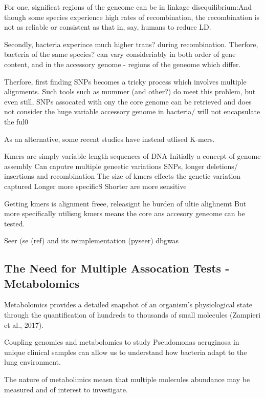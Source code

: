 \documentclass[]{article}
\begin{document}
For one, significat regions of the geneome can be in linkage
disequilibrium:And though some species experience high rates of
recombination, the recombination is not as reliable or consistent as
that in, say, humans to reduce LD.

Secondly, bacteria experince much higher trans? during recombination.
Therfore, bacteria of the same species? can vary consideriably in both
order of gene content, and in the accessory genome - regions of the
geneome which differ.

Therfore, first finding SNPs becomes a tricky process which involves
multiple alignments. Such tools such as mummer (and other?) do meet this
problem, but even still, SNPs assocated with ony the core genome can be
retrieved and does not consider the huge variable accessory genome in
bacteria/ will not encapsulate the ful0

As an alternative, some recent studies have instead utlised K-mers.

Kmers are simply variable length sequences of DNA Initially a concept of
genome assembly Can caputre multiple geneetic variations SNPs, longer
deletions/ insertions and recombination The size of kmers effects the
genetic variation captured Longer more specificS Shorter are more
sensitive

Getting kmers is alignment freee, releasignt he burden of ultie
alighnemt But more specifically utilisng kmers means the core ans
accesory geneome can be tested.

Seer (se (ref) and its reimplementation (pyseer) dbgwas

\hypertarget{the-need-for-multiple-assocation-tests---metabolomics}{%
\subsection{The Need for Multiple Assocation Tests -
Metabolomics}\label{the-need-for-multiple-assocation-tests---metabolomics}}

Metabolomics provides a detailed snapshot of an organism's physiological
state through the quantification of hundreds to thousands of small
molecules (Zampieri et al., 2017).

Coupling genomics and metabolomics to study Pseudomonas aeruginosa in
unique clinical samples can allow us to understand how bacteria adapt to
the lung environment.

The nature of metabolimics measn that multiple molecules abundance may
be measured and of interest to investigate.
\end{document}
